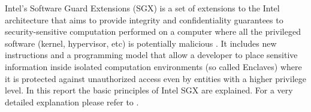Intel’s Software Guard Extensions (SGX) is a set of extensions to the Intel architecture that aims to provide integrity and confidentiality guarantees to security-sensitive
computation performed on a computer where all the privileged software (kernel, hypervisor, etc) is potentially malicious \cite{Costan2016IntelSE}. It includes new instructions
and a programming model that allow a developer to place sensitive information inside isolated computation environments (so called Enclaves) where it is protected against
unauthorized access even by entities with a higher privilege level. In this report the basic principles of Intel SGX are explained. For a very detailed explanation please refer
to \cite{Costan2016IntelSE}.